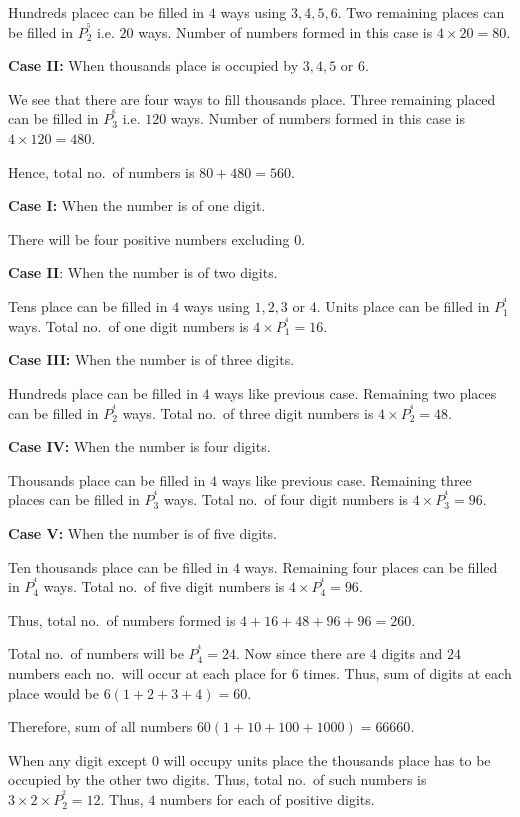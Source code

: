   Hundred\symbol[rightquote]s placec can be filled in $4$ ways using $3, 4, 5, 6$. Two remaining places can be filled in
  $P_2^^5$ i.e. $20$ ways. Number of numbers formed in this case is $4\times 20 = 80$.

  {\bf Case II:} When thousands place is occupied by $3, 4, 5$ or $6$.

  We see that there are four ways to fill thousands place. Three remaining placed can be filled in $P_3^^6$
  i.e. $120$ ways. Number of numbers formed in this case is $4\times 120 = 480$.

  Hence, total no.\ of numbers is $80 + 480 = 560$.
\item {\bf Case I:} When the number is of one digit.

  There will be four positive numbers excluding $0$.

  {\bf Case II}: When the number is of two digits.

  Ten\symbol[rightquote]s place can be filled in $4$ ways using $1, 2, 3$ or $4$. Unit\symbol[rightquote]s place can be filled in $P_1^^4$
  ways. Total no.\ of one digit numbers is $4\times P_1^^4 = 16$.

  {\bf Case III:} When the number is of three digits.

  Hundred\symbol[rightquote]s place can be filled in $4$ ways like previous case. Remaining two places can be filled in
  $P_2^^4$ ways. Total no.\ of three digit numbers is $4\times P_2^^4 = 48$.

  {\bf Case IV:} When the number is four digits.

  Thousand\symbol[rightquote]s place can be filled in $4$ ways like previous case. Remaining three places can be filled in
  $P_3^^4$ ways. Total no.\ of four digit numbers is $4\times P_3^^4 = 96$.

  {\bf Case V:} When the number is of five digits.

  Ten thousand\symbol[rightquote]s place can be filled in $4$ ways. Remaining four places can be filled in $P_4^^4$
  ways. Total no.\ of five digit numbers is $4\times P_4^^4 = 96$.

  Thus, total no.\ of numbers formed is $4 + 16 + 48 + 96 + 96 = 260$.
\item Total no.\ of numbers will be $P_4^^4 = 24$. Now since there are $4$ digits and $24$ numbers each
  no.\ will occur at each place for $6$ times. Thus, sum of digits at each place would be $6(1 + 2 + 3 + 4) =
  60$.

  Therefore, sum of all numbers $60(1 + 10 + 100 + 1000) = 66660$.
\item When any digit except $0$ will occupy unit\symbol[rightquote]s place the thousand\symbol[rightquote]s place has to be occupied by the
  other two digits. Thus, total no.\ of such numbers is $3\times2\times P_2^^2 = 12$. Thus, $4$ numbers for
  each of positive digits.


